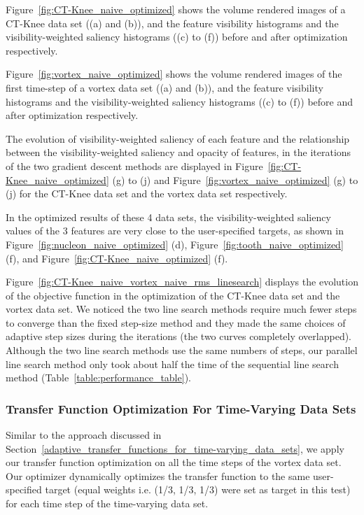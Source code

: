 Figure~\ref{fig:CT-Knee_naive_optimized} shows the volume rendered images of a CT-Knee data set ((a) and (b)), and the feature visibility histograms and the visibility-weighted saliency histograms ((c) to (f)) before and after optimization respectively.

Figure~\ref{fig:vortex_naive_optimized} shows the volume rendered images of the first time-step of a vortex data set ((a) and (b)), and the feature visibility histograms and the visibility-weighted saliency histograms ((c) to (f)) before and after optimization respectively.

The evolution of visibility-weighted saliency of each feature and the relationship between the visibility-weighted saliency and opacity of features, in the iterations of the two gradient descent methods are displayed in Figure~\ref{fig:CT-Knee_naive_optimized} (g) to (j) and Figure~\ref{fig:vortex_naive_optimized} (g) to (j) for the CT-Knee data set and the vortex data set respectively.

In the optimized results of these 4 data sets, the visibility-weighted saliency values of the 3 features are very close to the user-specified targets, as shown in Figure~\ref{fig:nucleon_naive_optimized} (d), Figure~\ref{fig:tooth_naive_optimized} (f), and Figure~\ref{fig:CT-Knee_naive_optimized} (f).

Figure~\ref{fig:CT-Knee_naive_vortex_naive_rms_linesearch} displays the evolution of the objective function in the optimization of the CT-Knee data set and the vortex data set.
We noticed the two line search methods require much fewer steps to converge than the fixed step-size method and they made the same choices of adaptive step sizes during the iterations (the two curves completely overlapped).
Although the two line search methods use the same numbers of steps, our parallel line search method only took about half the time of the sequential line search method (Table~\ref{table:performance_table}).

\subsubsection{Transfer Function Optimization For Time-Varying Data Sets}
Similar to the approach discussed in Section~\ref{adaptive_transfer_functions_for_time-varying_data_sets}, we apply our transfer function optimization on all the time steps of the vortex data set. Our optimizer dynamically optimizes the transfer function to the same user-specified target (equal weights i.e. (1/3, 1/3, 1/3) were set as target in this test) for each time step of the time-varying data set. 

